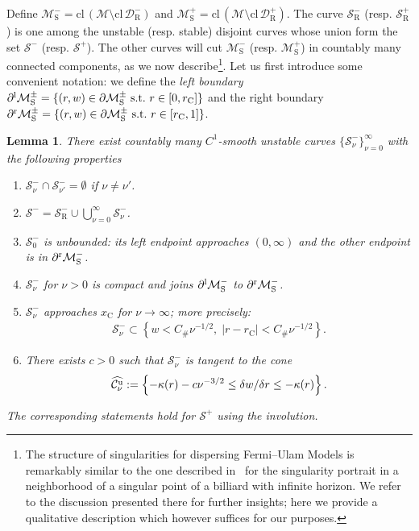 \documentclass[10pt]{amsart}
\newtheorem{lemm}[theo]{Lemma}\newtheorem{prop}[theo]{Proposition}\newtheorem{coro}[theo]{Corollary}\newtheorem{conj}[theo]{Conjecture}
\theoremstyle{definition}\newtheorem{defi}[theo]{Definition}\newtheorem{rema}[theo]{Remark}\newtheorem{exam}[theo]{Example}\newtheorem{exem}[theo]{Example}\newtheorem{nota}[theo]{Notation}
\newcommand{\ct}{r}
\newcommand{\curv}{\kappa}
\newcommand{\st}{\ \text{s.t.}\ }
\newcommand{\unstable}{\text{u}}
\newcommand{\crit}{\mathrm{C}}
\newcommand{\ctc}{\ct_\crit}
\newcommand{\xc}{x_\crit}
\newcommand{\cell}{\mathcal{D}}
\newcommand{\csp}{\mathcal{M}}
\newcommand{\cone}{\mathcal{C}}
\newcommand{\csps}{\csp_\text{S}}
\newcommand{\lboundary}{\partial^\text l}
\newcommand{\rboundary}{\partial^\text r}
\newcommand{\recoPrivate}{\mathrm{R}}
\newcommand{\reco}{{\cell^-_{\recoPrivate}}}
\newcommand{\backReco}{{\cell^+_{\recoPrivate}}}
\newcommand{\coneu}{\cone^\unstable}
\newcommand{\singPrivate}{\mathcal{S}}
\newcommand{\singReco}{\singPrivate_{\recoPrivate}}
\newcommand{\singForward}[1]{\singPrivate^+_{#1}}
\newcommand{\singBackward}[1]{\singPrivate^-_{#1}}
\newcommand{\indCell}{\nu}
\newcommand{\Const}{C_\#}
\newcommand{\clo}{\text{cl}\,}
\newcommand*{\relabel}{\renewcommand{\labelenumi}{(\theenumi)}}
\newcommand*{\alphenumi}{\renewcommand*{\theenumi}{\alph{enumi}}\relabel}
\let\oldhat\hat
\renewcommand*{\hat}[1]{\mathchoice{\widehat{#1}}{\widehat{#1}}{\oldhat{#1}}{\oldhat{#1}}}
\begin{document}
Define $\csps^- = \clo(\csp\setminus\clo\reco)$ and $\csps^+ = \clo(\csp\setminus\clo\backReco)$. The curve $\singReco^-$ (resp. $\singReco^+$) is one among the unstable (resp. stable) disjoint curves whose union form the set $\singBackward{}$ (resp. $\singForward{}$). The other curves will cut $\csps^-$ (resp. $\csps^+$) in countably many connected components, as we now describe\footnote{The structure of singularities for dispersing Fermi--Ulam Models is remarkably similar to the one described in~\cite[\S4.10]{ChM} for the singularity portrait in a neighborhood of a singular point of a billiard with infinite horizon. We refer to the discussion presented there for further insights; here we provide a qualitative description which however suffices for our purposes.}. Let us first introduce some convenient notation: we define the \emph{left boundary} $\lboundary\csps^\pm = \{(\ct,w)\in\partial\csps^\pm \st
\ct\in[0,\ctc]\}$ and the right boundary $\rboundary\csps^\pm = \{(\ct,w)\in\partial\csps^\pm \st
\ct\in[\ctc,1]\}$.
\begin{lemm}\label{LmSingF}
There exist countably many $C^1$-smooth unstable curves $\{\singBackward{\indCell}\}_{\indCell = 0}^{\infty}$ with the following properties
\begin{enumerate}\alphenumi
\item\label{lemm3.11.1} $\singBackward{\indCell}\cap\singBackward{\indCell'} = \emptyset$ if $\indCell\ne\indCell'$.
\item\label{lemm3.11.2} $\singBackward{} = \singReco^-\cup\bigcup_{\indCell = 0}^{\infty}\singBackward{\indCell}$.
\item\label{lemm3.11.3} $\singBackward{0}$ is unbounded: its left endpoint approaches $(0,\infty)$ and the other endpoint is in $\rboundary\csps^-$.
\item \label{lemm3.11.4}$\singBackward{\indCell}$ for $\indCell > 0$ is compact and joins $\lboundary\csps^-$ to $\rboundary\csps^-$.
\item\label{lemm3.11.5} $\singBackward{\indCell}$ approaches $\xc$ for $\indCell\to\infty$; more precisely:
\begin{align*}
\singBackward{\indCell}\subset\left\{w < \Const \indCell^{-1/2},\; |\ct-\ctc|< \Const \indCell^{-1/2} \right\}.
\end{align*}
\item\label{lemm3.11.6} There exists $c > 0$ such that $\singBackward{\indCell}$ is tangent to the cone
\begin{align*}
\hat{\coneu_{\indCell}} := \left\{-\curv(\ct)-c\indCell^{-3/2}\le\delta w/\delta r\le -\curv(\ct)\right\}.
\end{align*}
\end{enumerate}
The corresponding statements hold for $\singForward{}$ using the involution.
\end{lemm}
\end{document}
